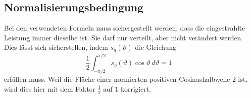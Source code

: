 \begin{refsection}
\subsection{Normalisierungsbedingung} \label{skript:eis:Modellverbesserung:Normalisierung}
Bei den verwendeten Formeln muss sichergestellt werden, dass die eingestrahlte Leistung immer dieselbe ist. Sie darf nur verteilt, aber nicht verändert werden. Dies lässt sich sicherstellen, indem $s_\eta(\vartheta)$ die Gleichung
\begin{equation}\label{skript:eis:Normalisierungsbedingung}
	\frac{1}{2}\int_{-\pi/2}^{\pi/2}s_{\eta}(\vartheta)\cos\vartheta\,d\vartheta
	=
	1
\end{equation}
erfüllen muss. Weil die Fläche einer normierten positiven Cosinushalbwelle $2$ ist, wird dies hier mit dem Faktor $\tfrac{1}{2}$ auf $1$ korrigiert.

\end{refsection}
